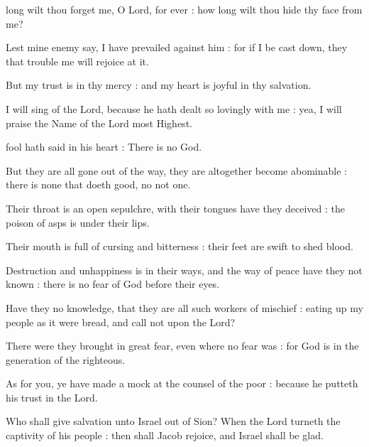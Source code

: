 
 long wilt thou forget me, O Lord, for ever : how long wilt thou hide thy face from me?\par
{}
Lest mine enemy say, I have prevailed against him : for if I be cast down, they that trouble me will rejoice at it.\par
{}But my trust is in thy mercy : and my heart is joyful in thy salvation.\par
{}I will sing of the Lord, because he hath dealt so lovingly with me : yea, I will praise the Name of the Lord most Highest.\par


 fool hath said in his heart : There is no God.\par
{}
But they are all gone out of the way, they are altogether become abominable : there is none that doeth good, no not one.\par
{}Their throat is an open sepulchre, with their tongues have they deceived : the poison of asps is under their lips.\par
{}Their mouth is full of cursing and bitterness : their feet are swift to shed blood.\par
{}Destruction and unhappiness is in their ways, and the way of peace have they not known : there is no fear of God before their eyes.\par
{}Have they no knowledge, that they are all such workers of mischief : eating up my people as it were bread, and call not upon the Lord?\par
{}There were they brought in great fear, even where no fear was : for God is in the generation of the righteous.\par
{}As for you, ye have made a mock at the counsel of the poor : because he putteth his trust in the Lord.\par
{}Who shall give salvation unto Israel out of Sion? When the Lord turneth the captivity of his people : then shall Jacob rejoice, and Israel shall be glad.\par


